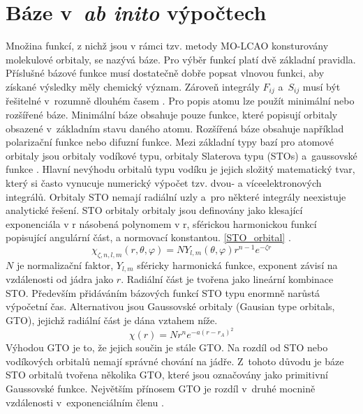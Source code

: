 \documentclass[
  printed, %
  table,   %
  lof,     %
  lot,     %
  oneside,
]{fithesis3}
\begin{document}
\section{Báze v~\textit{ab inito} výpočtech }\label{kapitola_baze}
Množina funkcí, z nichž jsou v rámci tzv. metody MO-LCAO konsturovány molekulové orbitaly, se nazývá báze. Pro výběr funkcí platí dvě základní pravidla. Příslušné bázové funkce musí dostatečně dobře popsat vlnovou funkci, aby získané výsledky měly chemický význam. Zároveň integrály $F_{ij}$ a~$S_{ij}$ musí být řešitelné v~rozumně dlouhém časem \cite{lowe2011quantum}.
Pro popis atomu lze použít minimální nebo rozšířené báze. Minimální báze obsahuje pouze funkce, které popisují orbitaly obsazené v~základním stavu daného atomu. Rozšířená báze obsahuje například polarizační funkce nebo difuzní funkce. Mezi základní typy bazí pro atomové orbitaly jsou orbitaly vodíkové typu, orbitaly Slaterova typu (STOs) a~gaussovské funkce \cite{dftshrnutivysledky}.
Hlavní nevýhodu orbitalů typu vodíku je jejich složitý matematický tvar, který si často vynucuje numerický výpočet tzv. dvou- a víceelektronových integrálů. Orbitaly STO nemají radiální uzly a~pro některé integrály neexistuje analytické řešení. STO orbitaly orbitaly jsou definovány jako klesající exponenciála v r násobená polynomem v r, sférickou harmonickou funkcí popisující angulární část, a normovací konstantou. \ref{STO_orbital} \cite{jensen2007introduction}.
\begin{equation}
\chi_{\zeta, n, l, m}(r, \theta, \varphi) = NY_{l,m} (\theta, \varphi) r^{n-1} e^{-\zeta r}
\label{STO_orbital} 
\end{equation}
$N$ je normalizační faktor, $Y_{l,m}$ sféricky harmonická funkce, exponent závisí na vzdálenosti od jádra jako $r$. Radiální část je tvořena jako lineární kombinace STO. Především přidáváním bázových funkcí STO typu enormně narůstá výpočetní čas. Alternativou jsou Gaussovské orbitaly (Gausian type orbitals, GTO), jejichž radiální část je dána vztahem níže.
\begin{equation}
\chi(r) = Nr^n e^{-a(r-r_A)^2}
\end{equation}
 Výhodou GTO je to, že jejich součin je stále GTO. Na rozdíl od STO nebo vodíkových orbitalů nemají správné chování na jádře. Z~tohoto důvodu je báze STO orbitalů tvořena několika GTO, které jsou označovány jako primitivní Gaussovské funkce. Největším přínosem GTO je rozdíl v~druhé mocnině vzdálenosti v~exponenciálním členu \cite{lowe2011quantum}. 
\end{document}

